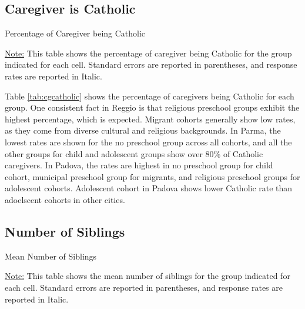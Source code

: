 \documentclass[12pt]{article}
\begin{document}
\subsection{Caregiver is Catholic}
\begin{table}[H]
\caption{Percentage of Caregiver being Catholic} \label{tab:cgcatholic}
\begin{center}
\scalebox{0.8}{

}
\end{center}
\begin{footnotesize}
\vspace{0.5mm} 

\underline{Note:} This table shows the percentage of caregiver being Catholic for the group indicated for each cell. Standard errors are reported in parentheses, and response rates are reported in Italic.
\end{footnotesize}
\end{table}

Table \ref{tab:cgcatholic} shows the percentage of caregivers being Catholic for each group. One consistent fact in Reggio is that religious preschool groups exhibit the highest percentage, which is expected. Migrant cohorts generally show low rates, as they come from diverse cultural and religious backgrounds. In Parma, the lowest rates are shown for the no preschool group across all cohorts, and all the other groups for child and adolescent groups show over 80\% of Catholic caregivers. In Padova, the rates are highest in no preschool group for child cohort, municipal preschool group for migrants, and religious preschool groups for adolescent cohorts. Adolescent cohort in Padova shows lower Catholic rate than adoelscent cohorts in other cities.

\subsection{Number of Siblings}
\begin{table}[H]
\caption{Mean Number of Siblings} \label{tab:numsib}
\begin{center}
\scalebox{0.8}{

}
\end{center}
\begin{footnotesize}
\vspace{0.5mm} 

\underline{Note:} This table shows the mean number of siblings for the group indicated for each cell. Standard errors are reported in parentheses, and response rates are reported in Italic.
\end{footnotesize}
\end{table}
\end{document}
